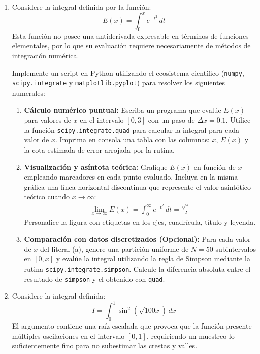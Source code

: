 \documentclass[12pt]{article}
\begin{document}
\begin{problemas}[]

\begin{enumerate}[leftmargin=*]
\item Considere la integral definida por la función:
\begin{equation}
    E(x) = \int_{0}^{x} e^{-t^2} \, dt
\end{equation}
Esta función no posee una antiderivada expresable en términos de funciones elementales, por lo que su evaluación requiere necesariamente de métodos de integración numérica.

Implemente un script en Python utilizando el ecosistema científico (\texttt{numpy}, \texttt{scipy.integrate} y \texttt{matplotlib.pyplot}) para resolver los siguientes numerales:

\begin{enumerate}[label=\textbf{\alph*)}]
    \item \textbf{Cálculo numérico puntual:}
    Escriba un programa que evalúe $E(x)$ para valores de $x$ en el intervalo $[0, 3]$ con un paso de $\Delta x = 0.1$. Utilice la función \texttt{scipy.integrate.quad} para calcular la integral para cada valor de $x$. Imprima en consola una tabla con las columnas: $x$, $E(x)$ y la cota estimada de error arrojada por la rutina.

    \item \textbf{Visualización y asíntota teórica:}
    Grafique $E(x)$ en función de $x$ empleando marcadores en cada punto evaluado. Incluya en la misma gráfica una línea horizontal discontinua que represente el valor asintótico teórico cuando $x \to \infty$:
    \begin{align*}
        \lim_{x \to \infty} E(x) = \int_{0}^{\infty} e^{-t^2} \, dt = \frac{\sqrt{\pi}}{2}
    \end{align*}
    Personalice la figura con etiquetas en los ejes, cuadrícula, título y leyenda.

    \item \textbf{Comparación con datos discretizados (Opcional):}
    Para cada valor de $x$ del literal (a), genere una partición uniforme de $N = 50$ subintervalos en $[0, x]$ y evalúe la integral utilizando la regla de Simpson mediante la rutina \texttt{scipy.integrate.simpson}. Calcule la diferencia absoluta entre el resultado de \texttt{simpson} y el obtenido con \texttt{quad}.
\end{enumerate}

    \item Considere la integral definida:
\begin{equation}
    I = \int_{0}^{1} \sin^2\left(\sqrt{100x}\right)\,dx
\end{equation}
El argumento contiene una raíz escalada que provoca que la función presente múltiples oscilaciones en el intervalo $[0, 1]$, requiriendo un muestreo lo suficientemente fino para no subestimar las crestas y valles.


\end{enumerate}
\end{problemas}
\end{document}
